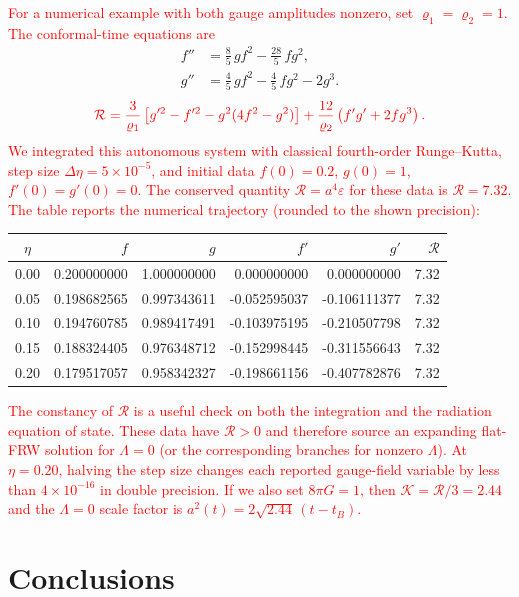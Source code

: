 \documentclass [prd,reprint,eqsecnum,nofootinbib]  {revtex4-1}
\newcommand{\science}[1]{\textcolor{red}{#1}}
\begin{document}
\science{For a numerical example with both gauge amplitudes nonzero,
set $\varrho_1=\varrho_2=1$. The conformal-time equations are}
{\color{red}
\begin{align}
f''&=\frac85\,g f^2-\frac{28}{5}\,f g^2,\nonumber\\
g''&=\frac45\,g f^2-\frac45\,f g^2-2g^3.
\end{align}}
\begin{equation}
\science{\mathcal R=
\frac{3}{\varrho_1}\left[g'^2-f'^2-g^2(4f^2-g^2)\right]
+\frac{12}{\varrho_2}\left(f'g'+2fg^3\right).}
\end{equation}
\science{We integrated this autonomous system with classical
fourth-order Runge--Kutta, step size $\Delta\eta=5\times10^{-5}$,
and initial data $f(0)=0.2$, $g(0)=1$, $f'(0)=g'(0)=0$. The
conserved quantity $\mathcal R=a^4\varepsilon$ for these data is
$\mathcal R=7.32$. The table reports the numerical trajectory
(rounded to the shown precision):}
\begin{center}
\color{red}
\begin{tabular}{c|rrrr|r}
$\eta$ & $f$ & $g$ & $f'$ & $g'$ & $\mathcal R$\\ \hline
0.00 & 0.200000000 & 1.000000000 & 0.000000000 & 0.000000000 & 7.32\\
0.05 & 0.198682565 & 0.997343611 & -0.052595037 & -0.106111377 & 7.32\\
0.10 & 0.194760785 & 0.989417491 & -0.103975195 & -0.210507798 & 7.32\\
0.15 & 0.188324405 & 0.976348712 & -0.152998445 & -0.311556643 & 7.32\\
0.20 & 0.179517057 & 0.958342327 & -0.198661156 & -0.407782876 & 7.32
\end{tabular}
\end{center}
\science{The constancy of $\mathcal R$ is a useful check on both the
integration and the radiation equation of state. These data have
$\mathcal R>0$ and therefore source an expanding flat-FRW solution
for $\Lambda=0$ (or the corresponding branches for nonzero
$\Lambda$). At $\eta=0.20$, halving the step size changes each
reported gauge-field variable by less than $4\times10^{-16}$ in
double precision. If we also set $8\pi G=1$, then
$\mathcal K=\mathcal R/3=2.44$ and the $\Lambda=0$ scale factor is
$a^2(t)=2\sqrt{2.44}\,(t-t_B)$.}

\section{Conclusions}
\end{document}
